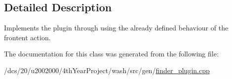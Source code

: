 \subsection{Detailed Description}
Implements the plugin through using the already defined behaviour of the frontent action. 

The documentation for this class was generated from the following file\+:\begin{DoxyCompactItemize}
\item 
/dcs/20/u2002000/4th\+Year\+Project/wash/src/gen/\mbox{\hyperlink{finder__plugin_8cpp}{finder\+\_\+plugin.\+cpp}}\end{DoxyCompactItemize}

